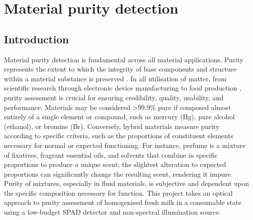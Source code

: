 \documentclass[12pt,a4paper,oneside]{report}
\let\oldsection\section
\renewcommand{\section}{\clearpage\oldsection}
\let\oldchapter\chapter
\renewcommand{\chapter}{\thispagestyle{fancy}\oldchapter}
\begin{document}
\newpage
\chapter{Material purity detection}
\label{chap:material_purity_detection}


\newpage
\section{Introduction}
\label{sec:chapter6_introduction}

Material purity detection is fundamental across all material applications. Purity represents the extent to which the integrity of base components and structure within a material substance is preserved \cite{klocek1991}. In all utilisation of matter, from scientific research through electronic device manufacturing \cite{goodman1986} to food production \cite{walstra1999}, purity assessment is crucial for ensuring credibility, quality, usability, and performance. Materials may be considered >99.9\% pure if composed almost entirely of a single element or compound, such as mercury (Hg), pure alcohol (ethanol), or bromine (Br). Conversely, hybrid materials measure purity according to specific criteria, such as the proportions of constituent elements necessary for normal or expected functioning. For instance, perfume is a mixture of fixatives, fragrant essential oils, and solvents that combine in specific proportions to produce a unique scent; the slightest alteration to expected proportions can significantly change the resulting scent, rendering it impure. Purity of mixtures, especially in fluid materials, is subjective and dependent upon the specific composition necessary for function. This project takes an optical approach to purity assessment of homogenised fresh milk in a consumable state using a low-budget SPAD detector and non-spectral illumination source.
\end{document}
